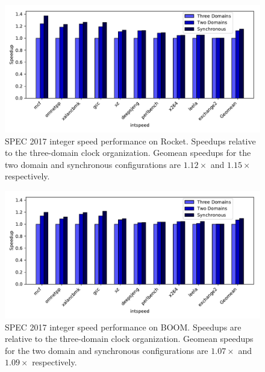 \begin{figure}[htb]
    \centering
    \includegraphics[width=\columnwidth]{figures/rocket-static-multiclock-speedup.pdf}
    \caption{SPEC 2017 integer speed performance on Rocket. Speedups relative to the three-domain clock organization.
    Geomean speedups for the two domain and synchronous configurations are $1.12\times$ and $1.15\times$ respectively.}


    \label{fig:rocket-static-speedup}
\end{figure}
\begin{figure}[htb]
    \centering
    \includegraphics[width=\columnwidth]{figures/boom-static-multiclock-speedup.pdf}
    \caption{SPEC 2017 integer speed performance on BOOM. Speedups are relative to the three-domain clock organization.
    Geomean speedups for the two domain and synchronous configurations are $1.07\times$ and $1.09\times$ respectively.}
    \label{fig:boom-static-speedup}
\end{figure}


